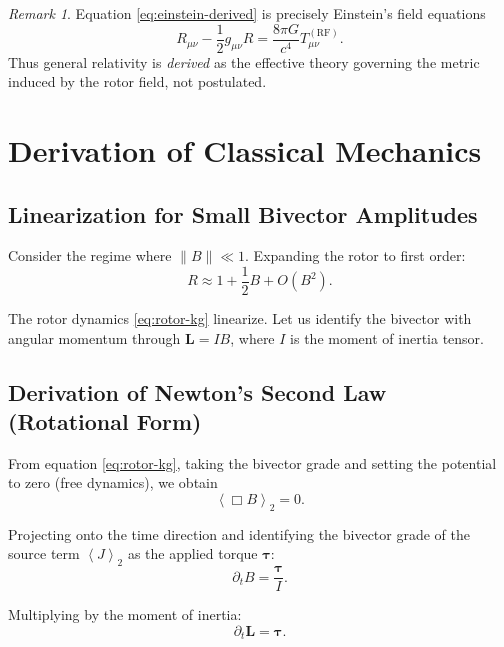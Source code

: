 \documentclass[11pt,a4paper]{article}
\numberwithin{equation}{section}
\theoremstyle{plain}
\theoremstyle{definition}
\theoremstyle{remark}
\newtheorem{remark}[theorem]{Remark}
\newcommand{\grade}[2]{\left\langle #1 \right\rangle_{#2}}
\newcommand{\biv}[1]{\grade{#1}{2}}        %
\begin{document}
\begin{remark}
Equation \eqref{eq:einstein-derived} is precisely Einstein's field equations
\begin{equation}
R_{\mu\nu} - \frac{1}{2}g_{\mu\nu}R = \frac{8\pi G}{c^4}T_{\mu\nu}^{(\mathrm{RF})}.
\end{equation}
Thus general relativity is \emph{derived} as the effective theory governing the metric induced by the rotor field, not postulated.
\end{remark}

\section{Derivation of Classical Mechanics}
\label{sec:classical}

\subsection{Linearization for Small Bivector Amplitudes}

Consider the regime where $\|B\| \ll 1$. Expanding the rotor to first order:
\begin{equation}
R \approx 1 + \frac{1}{2}B + O(B^2).
\end{equation}

The rotor dynamics \eqref{eq:rotor-kg} linearize. Let us identify the bivector with angular momentum through $\bm{L} = I B$, where $I$ is the moment of inertia tensor.

\subsection{Derivation of Newton's Second Law (Rotational Form)}

From equation \eqref{eq:rotor-kg}, taking the bivector grade and setting the potential to zero (free dynamics), we obtain
\begin{equation}
\biv{\Box B} = 0.
\end{equation}

Projecting onto the time direction and identifying the bivector grade of the source term $\biv{J}$ as the applied torque $\bm{\tau}$:
\begin{equation}
\partial_t B = \frac{\bm{\tau}}{I}.
\end{equation}

Multiplying by the moment of inertia:
\begin{equation}
\boxed{\partial_t \bm{L} = \bm{\tau}.}
\label{eq:newton-rotational}
\end{equation}
\end{document}
